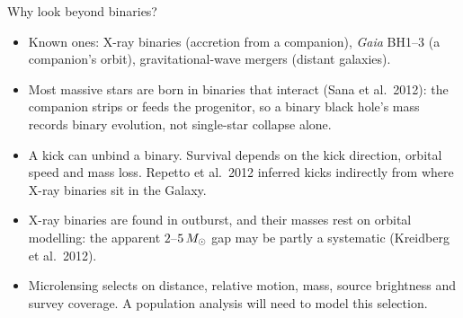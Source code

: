 \begin{frame}{Why look beyond binaries?}
{\begin{itemize}
        (Olejak et al.\ 2020), $2.2\times10^8$ at $5$--$16\,\Msun$ (Lam et al.\ 2020).
  \item Known ones: X-ray binaries (accretion from a companion), \emph{Gaia} BH1--3 (a companion's orbit),
        gravitational-wave mergers (distant galaxies).
  \item Most massive stars are born in binaries that interact (Sana et al.\ 2012): the companion strips or feeds the
        progenitor, so a binary black hole's mass records binary evolution, not single-star collapse alone.
  \item A kick can unbind a binary. Survival depends on the kick direction, orbital speed and mass loss.
        Repetto et al.\ 2012 inferred kicks indirectly from where X-ray binaries sit in the Galaxy.
  \item X-ray binaries are found in outburst, and their masses rest on orbital modelling: the apparent
        $2$--$5\,M_\odot$ gap may be partly a systematic (Kreidberg et al.\ 2012).
  \item Microlensing selects on distance, relative motion, mass, source brightness and survey coverage.
        A population analysis will need to model this selection.
\end{itemize}}
\end{frame}

